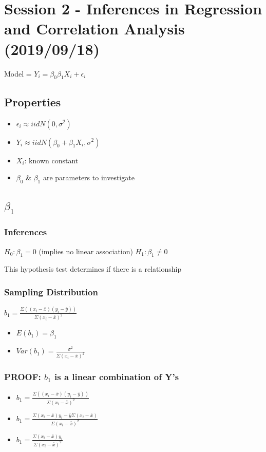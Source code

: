\documentclass[11pt]{article}
\begin{document}
\section{Session 2 - Inferences in Regression and Correlation Analysis (2019/09/18)}
\label{sec:orgbdcff9e}

Model = \(Y_i = \beta_0 \beta_1 X_i + \epsilon_i\)
\subsection{Properties}
\label{sec:orgfd7d1d7}
\begin{itemize}
\item \(\epsilon_i \approx iid N(0, \sigma^2)\)
\item \(Y_i \approx iid N(\beta_0 + \beta_1 X_i, \sigma^2)\)
\item \(X_i\): known constant
\item \(\beta_0\) \& \(\beta_1\) are parameters to investigate
\end{itemize}
\subsection{\(\beta_1\)}
\label{sec:org30b8223}
\subsubsection{Inferences}
\label{sec:orgbc6cf4b}
\(H_0: \beta_1 = 0\) (implies no linear association)
\(H_1: \beta_1 \neq 0\)

This hypothesis test determines if there is a relationship

\subsubsection{Sampling Distribution}
\label{sec:orga121183}
\(b_1 = \frac{\Sigma((x_i - \bar{x})(y_i - \bar{y} ))}{\Sigma(x_i - \bar{x})^2}\)

\begin{itemize}
\item \(E(b_1) = \beta_1\)
\item \(Var(b_1) = \frac{\sigma^2}{\Sigma(x_i - \bar{x})^2}\)
\end{itemize}

\subsubsection{PROOF: \(b_1\) is a linear combination of Y's}
\label{sec:orgcfb665a}
\begin{itemize}
\item \(b_1 = \frac{\Sigma((x_i - \bar{x})(y_i - \bar{y}))}{\Sigma(x_i - \bar{x})^2}\)
\item \(b_1 = \frac{\Sigma(x_i - \bar{x}) y_i - \bar{y} \Sigma(x_i - \bar{x})}{\Sigma(x_i - \bar{x})^2}\)
\item \(b_1 = \frac{\Sigma(x_i - \bar{x}) y_i}{\Sigma(x_i - \bar{x})^2}\)
\end{itemize}
\end{document}
